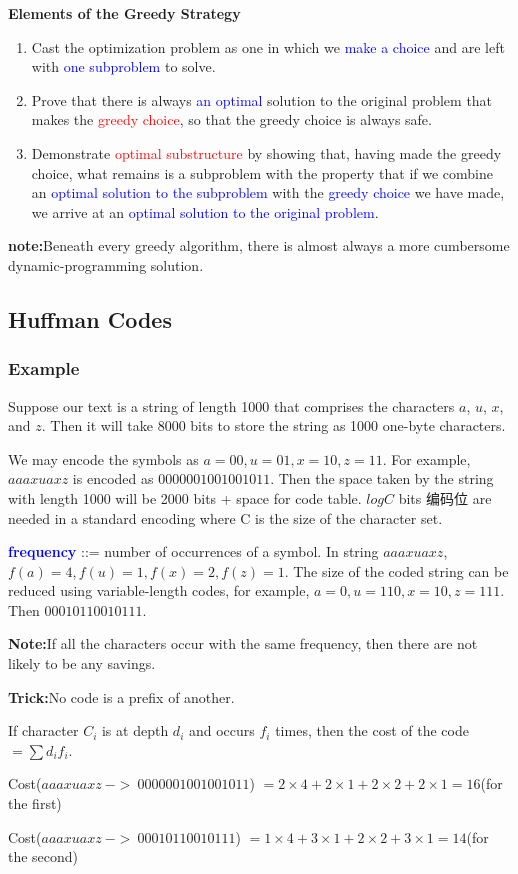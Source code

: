\documentclass{article}
\begin{document}
\textbf{Elements of the Greedy Strategy}
\begin{enumerate}
    \item Cast the optimization problem as one in which we \textcolor{blue}{make a choice} and are left with \textcolor{blue}{one subproblem} to solve.
    \item Prove that there is always \textcolor{blue}{an optimal} solution to the original problem that makes the \textcolor{red}{greedy choice}, so that the greedy choice is always safe.
    \item Demonstrate \textcolor{red}{optimal substructure} by showing that, having made the greedy choice, what remains is a subproblem with the property that if we combine an \textcolor{blue}{optimal solution to the subproblem} with the \textcolor{blue}{greedy choice} we have made, we arrive at an \textcolor{blue}{optimal solution to the original problem}. 
\end{enumerate}
\textbf{note:}Beneath every greedy algorithm, there is almost always a more cumbersome dynamic-programming solution.

\subsection{Huffman Codes}
\subsubsection{Example}
Suppose our text is a string of length 1000 that comprises the characters  $a$, $u$, $x$, and $z$. Then it will take 8000 bits to store the string as 1000 one-byte characters.\par
We may encode the symbols as $a = 00, u = 01, x = 10, z  = 11$. For example, $aaaxuaxz$ is encoded as $0000001001001011$. Then the space taken by the string with length 1000 will be 2000 bits + space for code table. $log C$ bits 编码位 are needed in a standard encoding where C is the size of the character set.\par
\textbf{\textcolor{blue}{frequency}} ::= number of occurrences of a symbol.
In string $aaaxuaxz$,  $f(a) = 4,  f(u) = 1,  f(x) = 2,  f(z) = 1$.
The size of the coded string can be reduced using variable-length codes, for example, $a = 0, u = 110, x = 10, z  = 111$. Then $00010110010111$.\par
\textbf{Note:}If all the characters occur with the same frequency, then there are not likely to be any savings.\par
\textbf{Trick:}No code is a prefix of another.\par
\hspace*{\fill}\par
If character $C_i$ is at depth $d_i$ and occurs $f_i$ times, then the cost of the code $= \sum d_i f_i$.\par
Cost($aaaxuaxz \ -> \ 0000001001001011$) $= 2 \times 4 + 2 \times 1 + 2 \times 2 + 2 \times 1 = 16$(for the first)\par
Cost($aaaxuaxz \ -> \ 00010110010111$) $= 1 \times 4 + 3 \times 1 + 2 \times 2 + 3 \times 1 = 14$(for the second)\par
\end{document}
